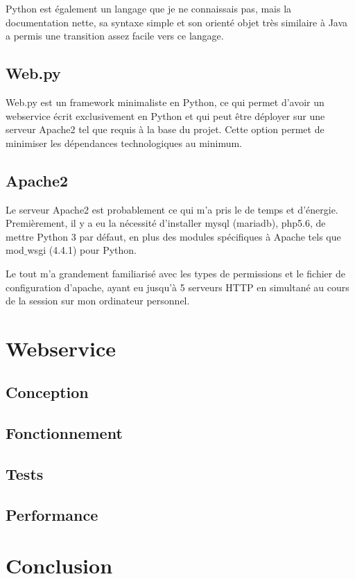 \documentclass[a4paper,12pt,titlepage]{article}
\begin{document}
Python est également un langage que je ne connaissais pas, mais la documentation nette, sa syntaxe simple et son orienté objet très similaire à Java a permis une transition assez facile vers ce langage. 
\subsection{Web.py}
Web.py est un framework minimaliste en Python, ce qui permet d'avoir un webservice écrit exclusivement en Python et qui peut être déployer sur une serveur Apache2 tel que requis à la base du projet. Cette option permet de minimiser les dépendances technologiques au minimum.
\subsection{Apache2}
Le serveur Apache2 est probablement ce qui m'a pris le de temps et d'énergie. Premièrement, il y a eu la nécessité d'installer mysql (mariadb), php5.6, de mettre Python 3 par défaut, en plus des modules spécifiques à Apache tels que mod$\_$wsgi (4.4.1) pour Python. \newline

Le tout m'a grandement familiarisé avec les types de permissions et le fichier de configuration d'apache, ayant eu jusqu'à 5 serveurs HTTP en simultané au cours de la session sur mon ordinateur personnel. 
\section{Webservice}
\subsection{Conception}
\subsection{Fonctionnement}
\subsection{Tests}
\subsection{Performance}

\section{Conclusion}
\end{document}
